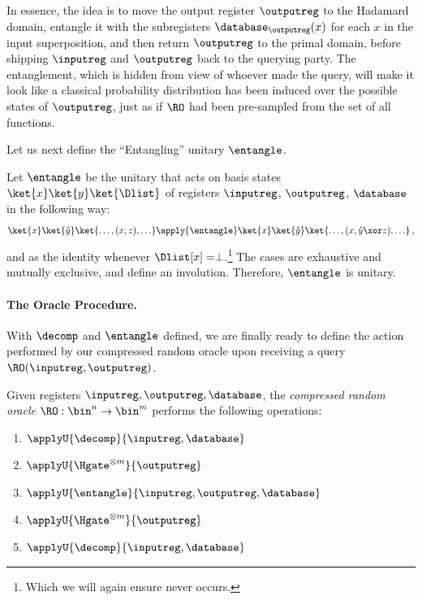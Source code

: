       In essence, the idea is to
        move the output register $\outputreg$ to the Hadamard
        domain, entangle it with the subregisters $\database_{\outputreg}(x)$
        for each $x$ in the input superposition,
        and then return $\outputreg$ to the primal domain, before shipping
        $\inputreg$ and $\outputreg$ back to the querying party.
        The entanglement, which is hidden from view of whoever made the query,
        will make it look like a classical probability distribution has been
        induced over the possible states of $\outputreg$, just as if $\RO$ had
        been pre-sampled from the set of all functions.

      Let us next define the ``Entangling'' unitary $\entangle$.

      \begin{definition}
        Let $\entangle$ be the unitary that acts on basis states
          $\ket{x}\ket{y}\ket{\Dlist}$ of registers
          $\inputreg$, $\outputreg$, $\database$
          in the following way:
          \[
            \ket{x}\ket{\hat y}\ket{\ldots, (x, z), \ldots} \apply{\entangle}
            \ket{x}\ket{\hat y}\ket{\ldots, (x, \hat y \xor z), \ldots}\, ,
          \]
          and as the identity whenever $\Dlist[x] = \perp$.\footnote{
            Which we will again ensure never occurs.
          } The cases are exhaustive and mutually exclusive, and define
          an involution. Therefore, $\entangle$ is unitary.
      \end{definition}

    \paragraph{The Oracle Procedure.}
      With $\decomp$ and $\entangle$ defined, we are finally ready to define
        the action performed by our compressed random oracle upon receiving a
        query $\RO(\inputreg, \outputreg)$.

      \begin{definition}
        \label{def:compressed-ros}
        Given registers $\inputreg,
          \outputreg, \database$, the \emph{compressed random oracle} 
          $\RO: \bin^n \to \bin^m$ performs the following operations:
        \begin{enumerate}
          \item $\applyU{\decomp}{\inputreg, \database}$
          \item $\applyU{\Hgate^{\otimes m}}{\outputreg}$
          \item $\applyU{\entangle}{\inputreg, \outputreg, \database}$
          \item $\applyU{\Hgate^{\otimes m}}{\outputreg}$
          \item $\applyU{\decomp}{\inputreg, \database}$
        \end{enumerate}
      \end{definition}

